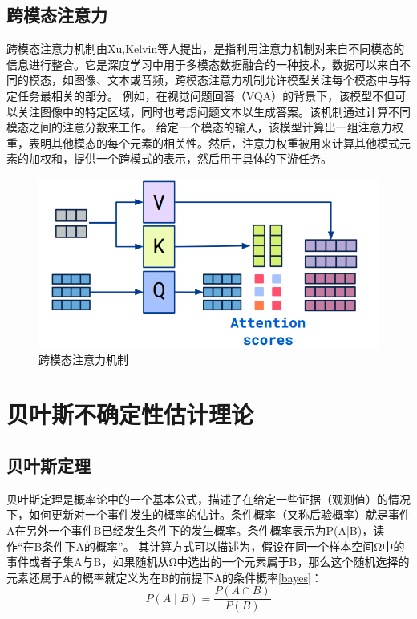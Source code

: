 \subsection{跨模态注意力}
跨模态注意力机制由Xu,Kelvin等人\cite{xu2015show}提出，是指利用注意力机制对来自不同模态的信息进行整合。它是深度学习中用于多模态数据融合的一种技术，数据可以来自不同的模态，如图像、文本或音频，跨模态注意力机制允许模型关注每个模态中与特定任务最相关的部分。
例如，在视觉问题回答（VQA）的背景下，该模型不但可以关注图像中的特定区域，同时也考虑问题文本以生成答案。该机制通过计算不同模态之间的注意分数来工作。
给定一个模态的输入，该模型计算出一组注意力权重，表明其他模态的每个元素的相关性。然后，注意力权重被用来计算其他模式元素的加权和，提供一个跨模式的表示，然后用于具体的下游任务。
\begin{figure}[htbp]
	\centering	
	\includegraphics[width=1\textwidth]{Fig/myfig/chapter2/cross-attention.png}  %
	\caption{\label{sys_need}跨模态注意力机制} 
\end{figure}

\section{贝叶斯不确定性估计理论}
\subsection{贝叶斯定理}
贝叶斯定理是概率论中的一个基本公式，描述了在给定一些证据（观测值）的情况下，如何更新对一个事件发生的概率的估计。条件概率（又称后验概率）就是事件A在另外一个事件B已经发生条件下的发生概率。条件概率表示为P(A|B)，读作“在B条件下A的概率”。
其计算方式可以描述为，假设在同一个样本空间Ω中的事件或者子集A与B，如果随机从Ω中选出的一个元素属于B，那么这个随机选择的元素还属于A的概率就定义为在B的前提下A的条件概率\eqref{bayes}：
\begin{equation}
	\label{bayes}
	P(A \mid B)=\frac{P(A \cap B)}{P(B)}
\end{equation}

